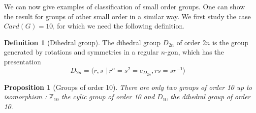\documentclass{article}
\theoremstyle{definition}
\theoremstyle{plain}
\theoremstyle{plain}
\theoremstyle{plain}
\theoremstyle{plain}
\theoremstyle{definition}
\newtheorem{defeng}[subsubsection]{Definition}
\theoremstyle{plain}
\newtheorem{thmeng}[subsubsection]{Theorem}
\theoremstyle{plain}
\newtheorem{propeng}[subsubsection]{Proposition}
\begin{document}



\par We can now give examples of classification of small order groups. One can show the result for groups of other small order in a similar way. We first study the case \( Card(G) = 10 \), for which we need the following definition.
\begin{defeng}[Dihedral group]
	The dihedral group \( D_{2n} \) of order \( 2n \) is the group generated by rotations and symmetries in a regular \(n\)-gon, which has the presentation 
	\begin{equation*}
		D_{2n} = \langle r,s \mid r^{n} = s^{2} = e_{D_{2n}}, rs = sr^{-1} \rangle 
	\end{equation*}
\end{defeng}

\begin{propeng}[Groups of order 10]
	There are only two groups of order 10 up to isomorphism : \( \mathbb{Z}_{10} \) the cylic group of order 10 and \( D_{10} \) the dihedral group of order 10.
\end{propeng}
\end{document}
